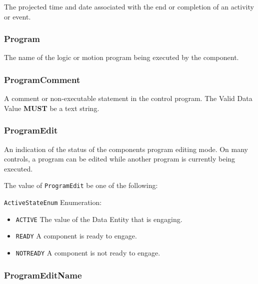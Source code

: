 The projected time and date associated with the end or completion of an activity or event.


\subsubsection{Program}
\label{sec:Program}



The name of the logic or motion program being executed by the  component.


\subsubsection{ProgramComment}
\label{sec:ProgramComment}



A comment or non-executable statement in the control program.
 The \gls{Valid Data Value} \textbf{MUST} be a text string.


\subsubsection{ProgramEdit}
\label{sec:ProgramEdit}



An indication of the status of the  components program editing mode. 
 On many controls, a program can be edited while another program is currently being executed.


The value of \texttt{ProgramEdit} \MUST be one of the following: 


\texttt{ActiveStateEnum} Enumeration:

\begin{itemize}
\item \texttt{ACTIVE} \newline The value of the \gls{Data Entity} that is engaging. 
\item \texttt{READY} \newline A component is ready to engage. 
\item \texttt{NOT\textunderscore READY} \newline A component is not ready to engage. 
\end{itemize}

\FloatBarrier

\subsubsection{ProgramEditName}
\label{sec:ProgramEditName}



